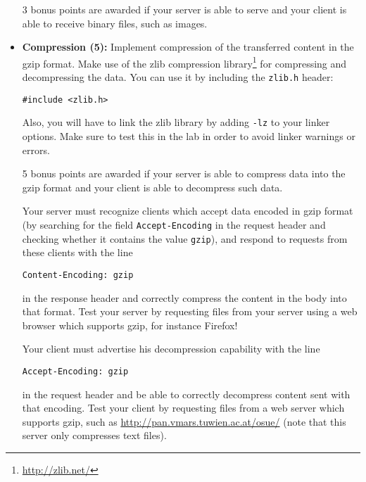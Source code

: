 \begin{itemize}
3 bonus points are awarded if your server is able to serve
and your client is able to receive binary files, such as images.


\item \textbf{Compression (5):}
Implement compression of the transferred content in the gzip format.
Make use of the zlib compression library\footnote{\url{http://zlib.net/}}
for compressing and decompressing the data.
You can use it by including the \texttt{zlib.h} header:

\verb|#include <zlib.h>|

Also, you will have to link the zlib library by adding \texttt{-lz} to your linker options.
Make sure to test this in the lab in order to avoid linker warnings or errors.

5 bonus points are awarded if your server is able to compress data
into the gzip format and your client is able to decompress such data.

Your server must recognize clients which accept data encoded in gzip format
(by searching for the field \verb|Accept-Encoding| in the request header
and checking whether it contains the value \verb|gzip|),
and respond to requests from these clients with the line

\verb|Content-Encoding: gzip|

in the response header
and correctly compress the content in the body into that format.
Test your server by requesting files from your server
using a web browser which supports gzip, for instance Firefox!

Your client must advertise his decompression capability with the line

\verb|Accept-Encoding: gzip|

in the request header and be able to correctly decompress content sent with that encoding.
Test your client by requesting files from a web server which supports gzip,
such as \url{http://pan.vmars.tuwien.ac.at/osue/}
(note that this server only compresses text files).

\end{itemize}




\osueguidelinesthree


